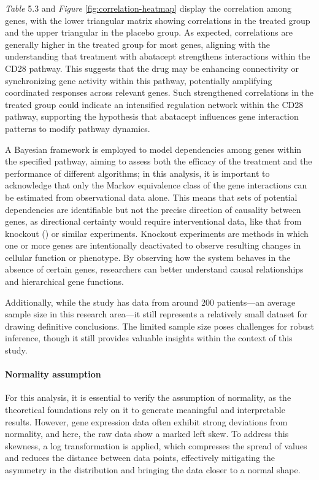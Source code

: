 \documentclass{report}
\begin{document}
	\textit{Table} 5.3 and  \textit{Figure} \ref{fig:correlation-heatmap} display the correlation among genes, with the lower triangular matrix showing correlations in the treated group and the upper triangular in the placebo group. As expected, correlations are generally higher in the treated group for most genes, aligning with the understanding that treatment with abatacept strengthens interactions within the CD28 pathway. This suggests that the drug may be enhancing connectivity or synchronizing gene activity within this pathway, potentially amplifying coordinated responses across relevant genes. Such strengthened correlations in the treated group could indicate an intensified regulation network within the CD28 pathway, supporting the hypothesis that abatacept influences gene interaction patterns to modify pathway dynamics.
	
	A Bayesian framework is employed to model dependencies among genes within the specified pathway, aiming to assess both the efficacy of the treatment and the performance of different algorithms; in this analysis, it is important to acknowledge that only the Markov equivalence class of the gene interactions can be estimated from observational data alone. This means that sets of potential dependencies are identifiable but not the precise direction of causality between genes, as directional certainty would require interventional data, like that from knockout (\citet{nikolay2017learning}) or similar experiments. Knockout experiments are methods in which one or more genes are intentionally deactivated to observe resulting changes in cellular function or phenotype. By observing how the system behaves in the absence of certain genes, researchers can better understand causal relationships and hierarchical gene functions.
	
	Additionally, while the study has data from around 200 patients—an average sample size in this research area—it still represents a relatively small dataset for drawing definitive conclusions. The limited sample size poses challenges for robust inference, though it still provides valuable insights within the context of this study.
	
	\paragraph{Normality assumption}
	For this analysis, it is essential to verify the assumption of normality, as the theoretical foundations rely on it to generate meaningful and interpretable results. However, gene expression data often exhibit strong deviations from normality, and here, the raw data show a marked left skew. To address this skewness, a log transformation is applied, which compresses the spread of values and reduces the distance between data points, effectively mitigating the asymmetry in the distribution and bringing the data closer to a normal shape.
	
\end{document}
